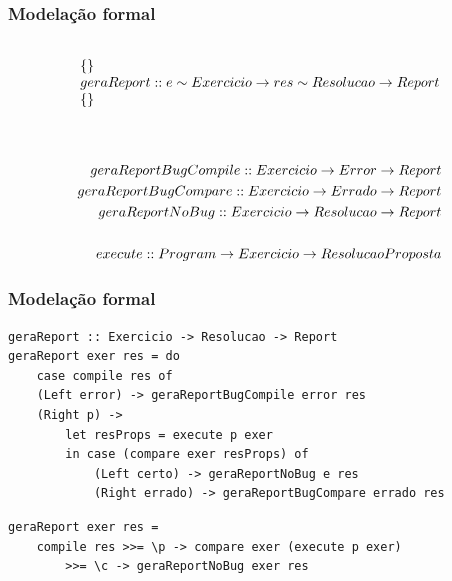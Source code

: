 \documentclass{beamer}
\begin{document}
\begin{frame} \frametitle{Modelação formal}
\begin{displaymath}
\begin{array}{l}
\prop
{ }
{geraReport :: e \unif Exercicio \rarrow res \unif Resolucao \rarrow Report}
{ }
\end{array}
\end{displaymath}
\\
\begin{eqnarray*}
geraReportBugCompile :: Exercicio \rightarrow Error \rightarrow Report\\
geraReportBugCompare :: Exercicio \rightarrow Errado \rightarrow Report\\
geraReportNoBug :: Exercicio \rightarrow Resolucao \rightarrow Report\\
\\
execute :: Program \rightarrow Exercicio \rightarrow ResolucaoProposta\\
\end{eqnarray*}
\end{frame}

\begin{frame}[fragile] \frametitle{Modelação formal}
\begin{lstlisting}[language=HaskellUlisses]
geraReport :: Exercicio -> Resolucao -> Report
geraReport exer res = do
    case compile res of
    (Left error) -> geraReportBugCompile error res
    (Right p) ->
        let resProps = execute p exer
        in case (compare exer resProps) of
            (Left certo) -> geraReportNoBug e res
            (Right errado) -> geraReportBugCompare errado res
\end{lstlisting}

\begin{lstlisting}[language=HaskellUlisses]
geraReport exer res =
    compile res >>= \p -> compare exer (execute p exer)
        >>= \c -> geraReportNoBug exer res
\end{lstlisting}
\end{frame}
\end{document}
